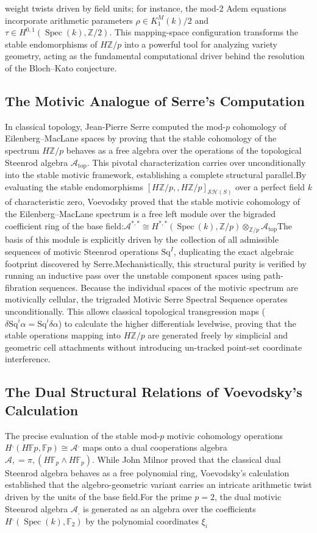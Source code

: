 \documentclass[11pt,oneside]{article}
\begin{document}
\begin{itemize}
weight twists driven by field units; for instance, the mod-2 Adem equations incorporate arithmetic parameters $\rho \in K_1^M(k)/2$ and $\tau \in H^{0,1}(\operatorname{Spec}(k), \mathbb{Z}/2)$. This mapping-space configuration transforms the stable endomorphisms of $H\mathbb{Z}/p$ into a powerful tool for analyzing variety geometry, acting as the fundamental computational driver behind the resolution of the Bloch--Kato conjecture.\subsection{The Motivic Analogue of Serre's Computation}In classical topology, Jean-Pierre Serre computed the mod-$p$ cohomology of Eilenberg--MacLane spaces by proving that the stable cohomology of the spectrum $H\mathbb{Z}/p$ behaves as a free algebra over the operations of the topological Steenrod algebra $\mathcal{A}_{\text{top}}$. This pivotal characterization carries over unconditionally into the stable motivic framework, establishing a complete structural parallel.By evaluating the stable endomorphisms $[H\mathbb{Z}/p, , H\mathbb{Z}/p]_{\mathcal{S}\mathcal{H}(S)}$ over a perfect field $k$ of characteristic zero, Voevodsky proved that the stable motivic cohomology of the Eilenberg--MacLane spectrum is a free left module over the bigraded coefficient ring of the base field:\(\mathcal{A}^{*,*}\cong H^{*,*}(\>\mathrm{Spec}\>(k),\mathbb{Z}/p)\otimes _{\mathbb{Z}/p}\mathcal{A}_{\text{top}}\)The basis of this module is explicitly driven by the collection of all admissible sequences of motivic Steenrod operations ${\text{Sq}^I}$, duplicating the exact algebraic footprint discovered by Serre.Mechanistically, this structural purity is verified by running an inductive pass over the unstable component spaces using path-fibration sequences. Because the individual spaces of the motivic spectrum are motivically cellular, the trigraded Motivic Serre Spectral Sequence operates unconditionally. This allows classical topological transgression maps ($\delta \text{Sq}^i \alpha = \text{Sq}^i \delta \alpha$) to calculate the higher differentials levelwise, proving that the stable operations mapping into $H\mathbb{Z}/p$ are generated freely by simplicial and geometric cell attachments without introducing un-tracked point-set coordinate interference.\subsection{The Dual Structural Relations of Voevodsky's Calculation}The precise evaluation of the stable mod-$p$ motivic cohomology operations $H^{,}(H\mathbb{F}p, \mathbb{F}p) \cong \mathcal{A}^{,}$ maps onto a dual cooperations algebra $\mathcal{A}{,} = \pi{,}(H\mathbb{F}_p \wedge H\mathbb{F}_p)$. While John Milnor proved that the classical dual Steenrod algebra behaves as a free polynomial ring, Voevodsky's calculation established that the algebro-geometric variant carries an intricate arithmetic twist driven by the units of the base field.For the prime $p=2$, the dual motivic Steenrod algebra $\mathcal{A}_{,}$ is generated as an algebra over the coefficients $H^{,}(\operatorname{Spec}(k), \mathbb{F}_2)$ by the polynomial coordinates $\xi_i$ 
\end{itemize}
\end{document}
